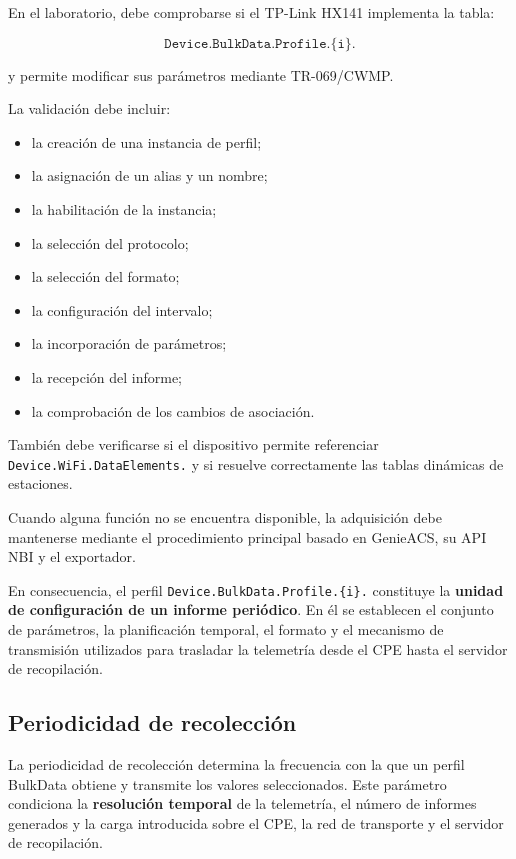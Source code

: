 En el laboratorio, debe comprobarse si el TP-Link HX141 implementa la
tabla:

\[
    \texttt{Device.BulkData.Profile.\{i\}.}
\]

y permite modificar sus parámetros mediante TR-069/CWMP.

La validación debe incluir:

\begin{itemize}
    \item la creación de una instancia de perfil;
    \item la asignación de un alias y un nombre;
    \item la habilitación de la instancia;
    \item la selección del protocolo;
    \item la selección del formato;
    \item la configuración del intervalo;
    \item la incorporación de parámetros;
    \item la recepción del informe;
    \item la comprobación de los cambios de asociación.
\end{itemize}

También debe verificarse si el dispositivo permite referenciar
\texttt{Device.WiFi.DataElements.} y si resuelve correctamente las tablas
dinámicas de estaciones.

Cuando alguna función no se encuentra disponible, la adquisición debe
mantenerse mediante el procedimiento principal basado en GenieACS, su API
NBI y el exportador.

En consecuencia, el perfil
\texttt{Device.BulkData.Profile.\{i\}.} constituye la
\textbf{unidad de configuración de un informe periódico}. En él se
establecen el conjunto de parámetros, la planificación temporal, el
formato y el mecanismo de transmisión utilizados para trasladar la
telemetría desde el CPE hasta el servidor de recopilación.

\subsection{Periodicidad de recolección}
\label{subsec:periodicidad-recoleccion}

La periodicidad de recolección determina la frecuencia con la que un
perfil BulkData obtiene y transmite los valores seleccionados. Este
parámetro condiciona la \textbf{resolución temporal} de la telemetría, el
número de informes generados y la carga introducida sobre el CPE, la red
de transporte y el servidor de recopilación.

